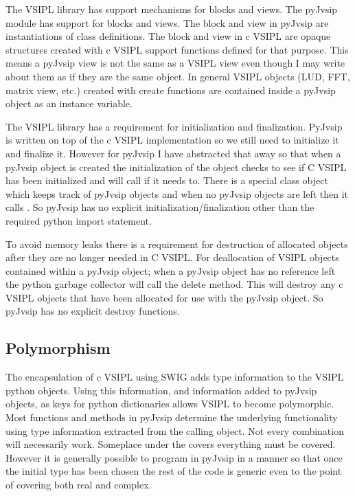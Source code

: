 The VSIPL library has support mechanisms for blocks and views. The pyJvsip module has support for blocks and views. The block and view in pyJvsip are instantiations of class definitions. The block and view in c VSIPL are opaque structures created with c VSIPL support functions defined for that purpose. This means a pyJvsip view is not the same as a VSIPL view even though I may write about them as if they are the same object. In general VSIPL objects (LUD, FFT, matrix view, etc.) created with create functions are contained inside a pyJvsip object as an instance variable.

The VSIPL library has a requirement for initialization and finalization.  PyJvsip is written on top of the c VSIPL implementation so we still need to initialize it and finalize it. However for pyJvsip I have abstracted that away so that when a pyJvsip object is created the initialization of the object checks to see if C VSIPL has been initialized and will call  if it needs to. There is a special class object which keeps track of pyJvsip objects and when no pyJvsip objects are left then it calls . So pyJvsip has no explicit initialization/finalization other than the required python import statement.  

To avoid memory leaks there is a requirement for destruction of allocated objects after they are no longer needed in C VSIPL. For deallocation of VSIPL objects contained within a pyJvsip object; when a pyJvsip object has no reference left the python garbage collector will call the delete method.  This will destroy any c VSIPL objects that have been allocated for use with the pyJvsip object. So pyJvsip has no explicit destroy functions.

\subsection*{Polymorphism}
The encapsulation of c VSIPL using SWIG adds type information to the VSIPL python objects. Using this information, and information added to pyJvsip objects, as keys for python dictionaries allows VSIPL to become polymorphic. Most functions and methods in pyJvsip determine the underlying functionality using type information extracted from the calling object. Not every combination will necessarily work.  Someplace under the covers everything must be covered.  However it is generally possible to program in pyJvsip in a manner so that once the initial type has been chosen the rest of the code is generic even to the point of covering both real and complex. 

